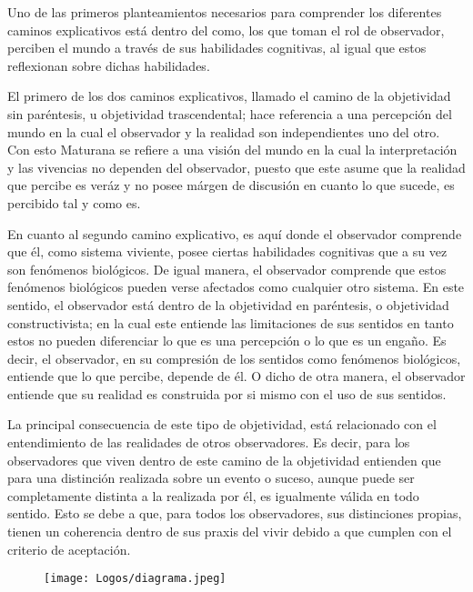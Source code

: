 \documentclass[10pt]{article}
\begin{document}
        Uno de las primeros planteamientos necesarios para comprender los diferentes caminos explicativos está dentro del como, los que toman el rol de observador, perciben el mundo a través de sus habilidades cognitivas, al igual que estos reflexionan sobre dichas habilidades. 

        El primero de los dos caminos explicativos, llamado el camino de la objetividad sin paréntesis, u objetividad trascendental; hace referencia a una percepción del mundo en la cual el observador y la realidad son independientes uno del otro. Con esto Maturana se refiere a una visión del mundo en la cual la interpretación y las vivencias no dependen del observador, puesto que este asume que la realidad que percibe es veráz y no posee márgen de discusión en cuanto lo que sucede, es percibido tal y como es.

        En cuanto al segundo camino explicativo, es aquí donde el observador comprende que él, como sistema viviente, posee ciertas habilidades cognitivas que a su vez son fenómenos biológicos. De igual manera, el observador comprende que estos fenómenos biológicos pueden verse afectados como cualquier otro sistema. En este sentido, el observador está dentro de la objetividad en paréntesis, o objetividad constructivista; en la cual este entiende las limitaciones de sus sentidos en tanto estos no pueden diferenciar lo que es una percepción o lo que es un engaño. Es decir, el observador, en su compresión de los sentidos como fenómenos biológicos, entiende que lo que percibe, depende de él. O dicho de otra manera, el observador entiende que su realidad es construida por si mismo con el uso de sus sentidos. 

        La principal consecuencia de este tipo de objetividad, está relacionado con el entendimiento de las realidades de otros observadores. Es decir, para los observadores que viven dentro de este camino de la objetividad entienden que para una distinción realizada sobre un evento o suceso, aunque puede ser completamente distinta a la realizada por él, es igualmente válida en todo sentido. Esto se debe a que, para todos los observadores, sus distinciones propias, tienen un coherencia dentro de sus praxis del vivir debido a que cumplen con el criterio de aceptación.

        \begin{figure}[H]
            \centering
            \texttt{[image: Logos/diagrama.jpeg]}
        \end{figure}
\end{document}
